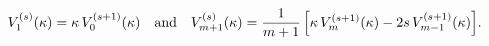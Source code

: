 \begin{equation}
V_1^{(s)}(\kappa)=\kappa\,V_{0}^{(s+1)}(\kappa)
\quad\text{and}\quad
V_{m+1}^{(s)}(\kappa)=\frac{1}{m+1}\,
\Bigl[\kappa\,V_{m}^{(s+1)}(\kappa)-2s\,V_{m-1}^{(s+1)}(\kappa)\Bigr].
\label{C3}
\end{equation}

